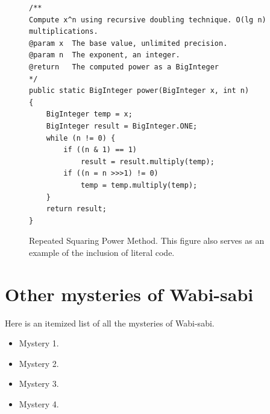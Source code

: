 \documentclass[dissertation]{bsu-cs}  %
\begin{document}
\begin{figure}[t]

\begin{vcode}
\begin{lstlisting}
/**
Compute x^n using recursive doubling technique. O(lg n) multiplications.
@param x  The base value, unlimited precision.
@param n  The exponent, an integer.
@return   The computed power as a BigInteger
*/
public static BigInteger power(BigInteger x, int n)
{
    BigInteger temp = x;
    BigInteger result = BigInteger.ONE;
	while (n != 0) {
        if ((n & 1) == 1)
            result = result.multiply(temp);
		if ((n = n >>>1) != 0)
           	temp = temp.multiply(temp);
    }
    return result;
}
\end{lstlisting}
\end{vcode}
\caption[Repeated Squaring Power Method]{Repeated Squaring Power Method. This figure
also serves as an example of the inclusion of literal code.}
%
\label{fig:code}
\end{figure}


\section{Other mysteries of Wabi-sabi}

Here is an itemized list of all the mysteries of Wabi-sabi.
\begin{itemize}
\item Mystery 1.
\item Mystery 2.
\item Mystery 3.
\item Mystery 4.
\end{itemize}

\end{document}
